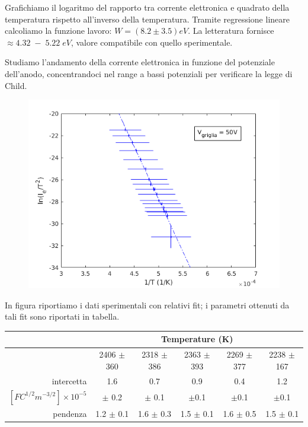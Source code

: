 \documentclass[11pt,a4paper]{article}
\begin{document}
Grafichiamo il logaritmo del rapporto tra corrente elettronica e quadrato della temperatura rispetto all'inverso della temperatura. Tramite regressione lineare calcoliamo la funzione lavoro: $W = (8.2 \pm 3.5) eV$. La letteratura fornisce $\approx 4.32 \; - \; 5.22 \; eV$, valore compatibile con quello sperimentale.

	

Studiamo l'andamento della corrente elettronica in funzione del potenziale dell'anodo, concentrandoci nel range a bassi potenziali per verificare la legge di Child. 

\begin{figure}[!h]
\includegraphics[width=\textwidth]{richardsonlin}
\end{figure}

In figura riportiamo i dati sperimentali con relativi fit; i parametri ottenuti da tali fit sono riportati in tabella.

\begin{center}
\begin{tabular}{|r|c|c|c|c|c|}
\hline

&\multicolumn{5}{|c|}{Temperature (K)}\\ \hline
&2406 $\pm$ 360& 	2318 $\pm$ 386&	2363 $\pm$ 393 &	2269 $\pm$ 377&	2238 $\pm$ 167\\ \hline
intercetta&	1.6&	0.7&	0.9&	0.4&	1.2\\ 
$[F C^{1/2} m^{-3/2}] \times 10^{-5}$&	$\pm$ 0.2&	$\pm$ 0.1&	$\pm$0.1&	$\pm$0.1&	$\pm$0.1	  \\ \hline
pendenza&	1.2 $\pm$ 0.1	&	1.6 $\pm$ 0.3&	1.5 $\pm$ 0.1&	1.6 $\pm$ 0.5&	1.5 $\pm$ 0.1\\ \hline 
\end{tabular}
\end{center}
\end{document}
